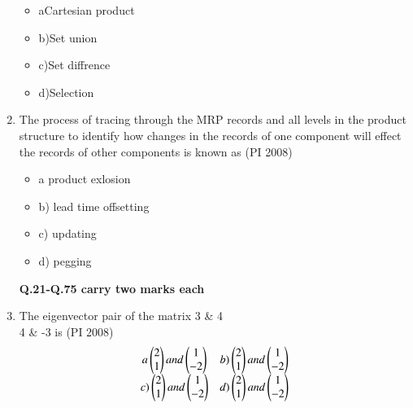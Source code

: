 \documentclass[journal,12pt,onecolumn]{IEEEtran}
\theoremstyle{remark}
\begin{document}
\begin{enumerate}
\begin{itemize}[label={}]
        \item aCartesian product            \item b)Set union 
        \item c)Set diffrence                \item d)Selection 
    \end{itemize}
\vspace{1cm}
\item %
The process of tracing through the MRP records and all levels in the product structure to identify how changes in the records of one component will effect the records of other components is known as
    \hfill{(PI 2008)}\\
    \begin{itemize}
        \item a product exlosion
        \item b) lead time offsetting
        \item c) updating
        \item d) pegging
    \end{itemize}
\vspace{1cm}
\textbf{Q.21-Q.75 carry two marks each}
\vspace{1cm}
\item %
The eigenvector pair of the matrix
\myvec 
{3 & 4 \\
4 & -3}
 is
    \hfill{(PI 2008)}\\
    \[\begin{matrix}
   { a \ensuremath{\begin{pmatrix} 2 \\ 1
    \end{pmatrix}}  and \ensuremath{\begin{pmatrix} 1 \\-2
    \end{pmatrix}}} & {b) \begin{pmatrix} 2 \\ 1
    \end{pmatrix} and \begin{pmatrix} 1 \\-2
    \end{pmatrix}}\\
    { c) \begin{pmatrix} 2 \\ 1
    \end{pmatrix}  and \begin{pmatrix} 1 \\-2
    \end{pmatrix}} & {d) \begin{pmatrix} 2 \\ 1
    \end{pmatrix} and \begin{pmatrix} 1 \\-2
    \end{pmatrix}}
    

\end{matrix}\]
\end{enumerate}
\end{document}
